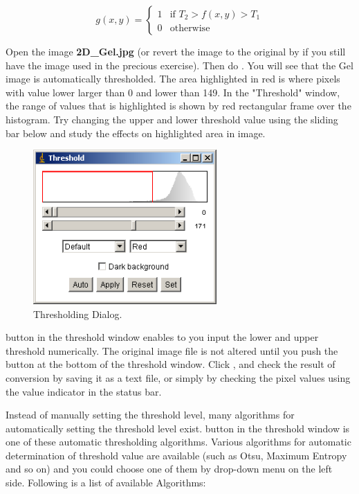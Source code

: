 \begin{equation}
g(x,y)= 
\begin{cases}
1 & \text{if $T_2 > f(x, y) > T_1$}\\
0 & \text{otherwise}
\end{cases}
\end{equation}

\begin{indentexercise}{2}
Open the image \textbf{2D\_Gel.jpg} (or
revert the image to the original by  if you still have the image used in the precious exercise).
Then do . 
You will see that the Gel image is automatically
thresholded. The area highlighted in red is where pixels with value
lower larger than 0 and lower than 149. In the
"Threshold" window, the range of values that is highlighted is shown by red rectangular frame over the
histogram. Try changing the upper and lower threshold value using the
sliding bar below and study the effects on highlighted area in image. 

\begin{figure}[htbp]
\begin{center}
\includegraphics[width=7cm]{fig/CMCIBasicCourse201102-img107.png}
\caption{ Thresholding Dialog.}
\label{fig:img107}
\end{center}
\end{figure}

 button in the threshold
window enables to you input the lower and upper threshold numerically.
The original image file is not altered until you push the button
 at the bottom of the
threshold window. Click , and
check the result of conversion by saving it as a text file, or simply
by checking the pixel values using the value indicator in the status
bar. 
\end{indentexercise}

Instead of manually setting the threshold level, many algorithms for
automatically setting the threshold level exist.
 button in the threshold
window is one of these automatic thresholding algorithms. Various
algorithms for automatic determination of threshold value are available
(such as Otsu, Maximum Entropy and so on) and you could choose one of
them by drop-down menu on the left side. Following is a list of
available Algorithms:


